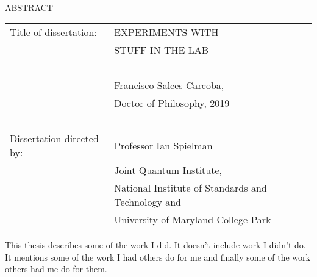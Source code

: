 
\hbox{\ }

\renewcommand{\baselinestretch}{1}
\small \normalsize

\begin{center}
\large{{ABSTRACT}} 

\vspace{3em} 

\end{center}
\hspace{-.15in}
\begin{tabular}{ll}
Title of dissertation:   
&				      {\large  EXPERIMENTS WITH} \\
&				      {\large  STUFF IN THE LAB} \\
\ \\
&                     {\large  Francisco Salces-Carcoba,} \\
&					  {\large  Doctor of Philosophy, 2019} \\
\ \\
Dissertation directed by: & {\large  Professor Ian Spielman} \\
&  							{\small	 Joint Quantum Institute,} \\
&  							{\small	 National Institute of Standards and Technology and} \\
&  							{\small	 University of Maryland College Park} \\
\end{tabular}

\vspace{3em}

\renewcommand{\baselinestretch}{2}
\large \normalsize

This thesis describes some of the work I did. It doesn't include work I didn't do. It mentions some of the work I had others do for me and finally some of the work others had me do for them.


